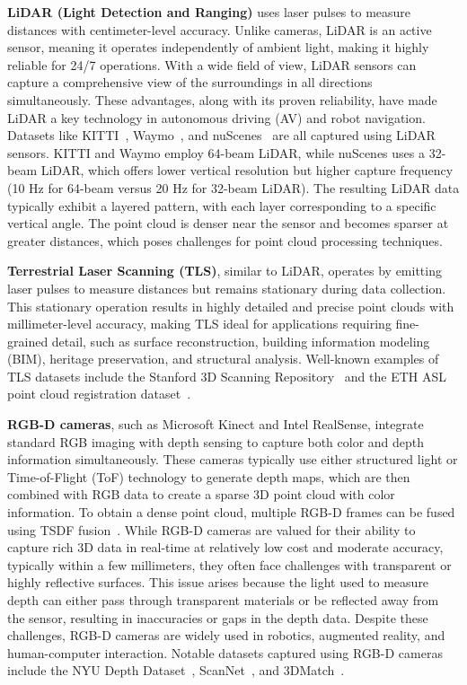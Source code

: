 \textbf{LiDAR (Light Detection and Ranging)} uses laser pulses to measure distances with centimeter-level accuracy. Unlike cameras, LiDAR is an active sensor, meaning it operates independently of ambient light, making it highly reliable for 24/7 operations. With a wide field of view, LiDAR sensors can capture a comprehensive view of the surroundings in all directions simultaneously. These advantages, along with its proven reliability, have made LiDAR a key technology in autonomous driving (AV) and robot navigation. Datasets like KITTI~\cite{geiger2012we}, Waymo~\cite{sun2020scalability}, and nuScenes~\cite{caesar2020nuscenes} are all captured using LiDAR sensors. KITTI and Waymo employ 64-beam LiDAR, while nuScenes uses a 32-beam LiDAR, which offers lower vertical resolution but higher capture frequency (10 Hz for 64-beam versus 20 Hz for 32-beam LiDAR). The resulting LiDAR data typically exhibit a layered pattern, with each layer corresponding to a specific vertical angle. The point cloud is denser near the sensor and becomes sparser at greater distances, which poses challenges for point cloud processing techniques.

\textbf{Terrestrial Laser Scanning (TLS)}, similar to LiDAR, operates by emitting laser pulses to measure distances but remains stationary during data collection. This stationary operation results in highly detailed and precise point clouds with millimeter-level accuracy, making TLS ideal for applications requiring fine-grained detail, such as surface reconstruction, building information modeling (BIM), heritage preservation, and structural analysis. Well-known examples of TLS datasets include the Stanford 3D Scanning Repository~\cite{curless1996volumetric} and the ETH ASL point cloud registration dataset~\cite{Pomerleau_2012}.

\textbf{RGB-D cameras}, such as Microsoft Kinect and Intel RealSense, integrate standard RGB imaging with depth sensing to capture both color and depth information simultaneously. These cameras typically use either structured light or Time-of-Flight (ToF) technology to generate depth maps, which are then combined with RGB data to create a sparse 3D point cloud with color information. To obtain a dense point cloud, multiple RGB-D frames can be fused using TSDF fusion~\cite{curless1996volumetric,zeng20163dmatch}. While RGB-D cameras are valued for their ability to capture rich 3D data in real-time at relatively low cost and moderate accuracy, typically within a few millimeters, they often face challenges with transparent or highly reflective surfaces. This issue arises because the light used to measure depth can either pass through transparent materials or be reflected away from the sensor, resulting in inaccuracies or gaps in the depth data. Despite these challenges, RGB-D cameras are widely used in robotics, augmented reality, and human-computer interaction. Notable datasets captured using RGB-D cameras include the NYU Depth Dataset~\cite{Silberman_ECCV12}, ScanNet~\cite{dai2017scannet}, and 3DMatch~\cite{zeng20163dmatch}.

